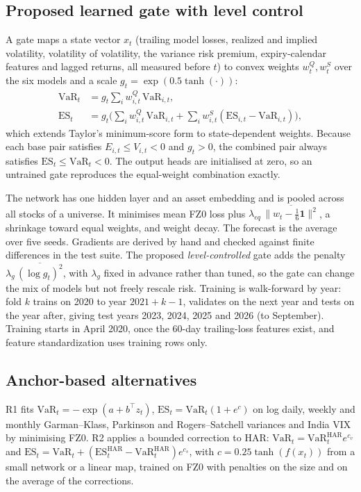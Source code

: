 \documentclass[conference]{IEEEtran}
\begin{document}
\subsection{Proposed learned gate with level control}
A gate maps a state vector $x_t$ (trailing model losses, realized and implied volatility, volatility of volatility, the variance risk premium, expiry-calendar features and lagged returns, all measured before $t$) to convex weights $w^Q_t, w^S_t$ over the six models and a scale $g_t=\exp(0.5\tanh(\cdot))$:
\begin{align}
\mathrm{VaR}_t &= g_t \textstyle\sum_i w^Q_{i,t}\,\mathrm{VaR}_{i,t},\\
\mathrm{ES}_t &= g_t\big(\textstyle\sum_i w^Q_{i,t}\,\mathrm{VaR}_{i,t} + \sum_i w^S_{i,t}(\mathrm{ES}_{i,t}-\mathrm{VaR}_{i,t})\big),
\end{align}
which extends Taylor's minimum-score form \cite{taylor2020} to state-dependent weights. Because each base pair satisfies $E_{i,t}\le V_{i,t}<0$ and $g_t>0$, the combined pair always satisfies $\mathrm{ES}_t\le\mathrm{VaR}_t<0$. The output heads are initialised at zero, so an untrained gate reproduces the equal-weight combination exactly.

The network has one hidden layer and an asset embedding and is pooled across all stocks of a universe. It minimises mean FZ0 loss plus $\lambda_{eq}\,\overline{\|w_t-\tfrac16\mathbf 1\|^2}$, a shrinkage toward equal weights, and weight decay. The forecast is the average over five seeds. Gradients are derived by hand and checked against finite differences in the test suite. The proposed \emph{level-controlled} gate adds the penalty $\lambda_g\,\overline{(\log g_t)^2}$, with $\lambda_g$ fixed in advance rather than tuned, so the gate can change the mix of models but not freely rescale risk. Training is walk-forward by year: fold $k$ trains on 2020 to year $2021+k-1$, validates on the next year and tests on the year after, giving test years 2023, 2024, 2025 and 2026 (to September). Training starts in April 2020, once the 60-day trailing-loss features exist, and feature standardization uses training rows only.

\subsection{Anchor-based alternatives}
R1 fits $\mathrm{VaR}_t=-\exp(a+b^\top z_t)$, $\mathrm{ES}_t=\mathrm{VaR}_t(1+e^{c})$ on log daily, weekly and monthly Garman--Klass, Parkinson and Rogers--Satchell variances and India VIX by minimising FZ0. R2 applies a bounded correction to HAR: $\mathrm{VaR}_t=\mathrm{VaR}^{\mathrm{HAR}}_t e^{c_v}$ and $\mathrm{ES}_t=\mathrm{VaR}_t+(\mathrm{ES}^{\mathrm{HAR}}_t-\mathrm{VaR}^{\mathrm{HAR}}_t)e^{c_s}$, with $c=0.25\tanh(f(x_t))$ from a small network or a linear map, trained on FZ0 with penalties on the size and on the average of the corrections.
\end{document}

